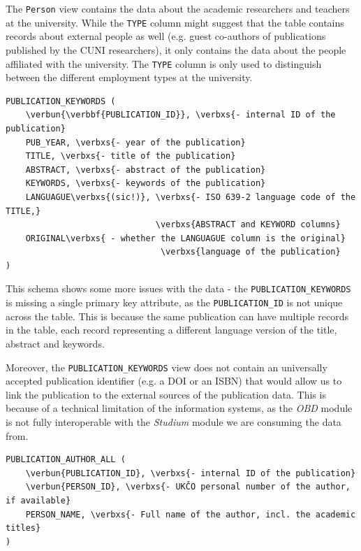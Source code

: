 The \texttt{Person} view contains the data about the academic researchers and teachers at the university.
While the \texttt{TYPE} column might suggest that the table contains records about external people as well (e.g. guest co-authors of publications published by the CUNI researchers),
it only contains the data about the people affiliated with the university. The \texttt{TYPE} column is only used to distinguish between the different employment types at the university.

\begin{Verbatim}[commandchars=\\\{\}]
PUBLICATION_KEYWORDS (
    \verbun{\verbbf{PUBLICATION_ID}}, \verbxs{- internal ID of the publication}
    PUB_YEAR, \verbxs{- year of the publication}
    TITLE, \verbxs{- title of the publication}
    ABSTRACT, \verbxs{- abstract of the publication}
    KEYWORDS, \verbxs{- keywords of the publication}
    LANGUAGUE\verbxs{(sic!)}, \verbxs{- ISO 639-2 language code of the TITLE,}
                              \verbxs{ABSTRACT and KEYWORD columns}
    ORIGINAL\verbxs{ - whether the LANGUAGUE column is the original}
                               \verbxs{language of the publication}
)
\end{Verbatim}

This schema shows some more issues with the data - the \texttt{PUBLICATION\_KEYWORDS} is missing a single primary key attribute,
as the \texttt{PUBLICATION\_ID} is not unique across the table. This is because the same publication can have multiple records in the table,
each record representing a different language version of the title, abstract and keywords.

Moreover, the \texttt{PUBLICATION\_KEYWORDS} view does not contain an universally accepted publication identifier (e.g. a DOI or an ISBN) 
that would allow us to link the publication to the external sources of the publication data.
This is because of a technical limitation of the information systems, as the \textit{OBD} module is not fully interoperable with the \textit{Studium} module we are 
consuming the data from.

\label{sec:pub-author-all}
\begin{Verbatim}[commandchars=\\\{\}]
PUBLICATION_AUTHOR_ALL (
    \verbun{PUBLICATION_ID}, \verbxs{- internal ID of the publication}
    \verbun{PERSON_ID}, \verbxs{- UKČO personal number of the author, if available}
    PERSON_NAME, \verbxs{- Full name of the author, incl. the academic titles}
)
\end{Verbatim}


